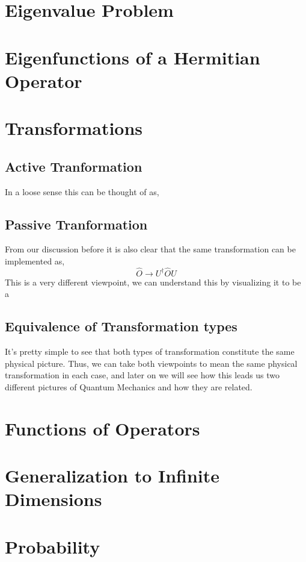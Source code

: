 \section{Eigenvalue Problem}
\section{Eigenfunctions of a Hermitian Operator}

\section{Transformations}
\subsection{Active Tranformation}
In a loose sense this can be thought of as,

\subsection{Passive Tranformation}
From our discussion before it is also clear that the same transformation can be implemented as,
\begin{equation}
\hat{O} \rightarrow U^{\dagger}\hat{O}U
\end{equation}
This is a very different viewpoint, we can understand this by visualizing it to be a 
\subsection{Equivalence of Transformation types}
It's pretty simple to see that both types of transformation constitute the same physical picture. Thus, we can take both viewpoints to mean the same physical transformation in each case, and later on we will see how this leads us two different pictures of Quantum Mechanics and how they are related.
\section{Functions of Operators}
\section{Generalization to Infinite Dimensions}
\section{Probability}
